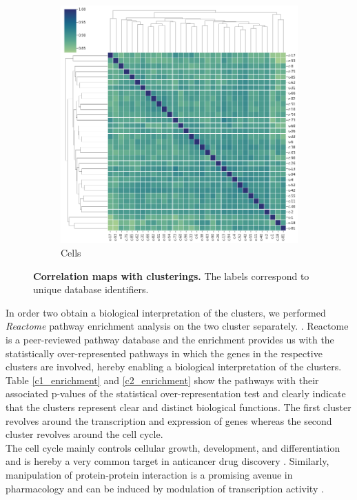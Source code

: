 \documentclass[bsc,frontabs,twoside,singlespacing,parskip,deptreport]{infthesis}     %
\begin{document}
\begin{figure}[h!]
\begin{subfigure}{.5\textwidth}
  \includegraphics[width=.9\linewidth]{images/cell_corr.png}
  \caption{Cells}
  \label{cell_map}
\end{subfigure}
\caption{\textbf{Correlation maps with clusterings.} The labels correspond to unique database identifiers.}
\label{corr_maps}
\end{figure}
In order two obtain a biological interpretation of the clusters, we performed \textit{Reactome} pathway enrichment analysis on the two cluster separately. \cite{fabregat_reactome_2017}. Reactome is a peer-reviewed pathway database and the enrichment provides us with the statistically over-represented pathways in which the genes in the respective clusters are involved, hereby enabling a biological interpretation of the clusters.\\
Table \ref{c1_enrichment} and \ref{c2_enrichment} show the pathways with their associated p-values of the statistical over-representation test and clearly indicate that the clusters represent clear and distinct biological functions. The first cluster revolves around the transcription and expression of genes whereas the second cluster revolves around the cell cycle.\\
The cell cycle mainly controls cellular growth, development, and differentiation and is hereby a very common target in anticancer drug discovery \cite{bai_cell_2017}. Similarly, manipulation of protein-protein interaction is a promising avenue in pharmacology and can be induced by modulation of transcription activity \cite{fontaine_pharmacological_2015}.
\end{document}
